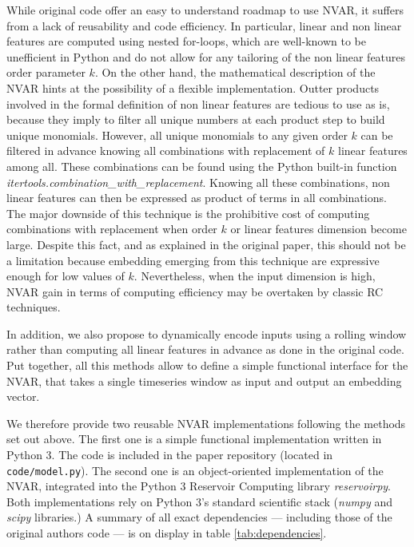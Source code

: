 While original code offer an easy to understand roadmap to use NVAR, it
suffers from a lack of reusability and code efficiency. In particular, linear
and non linear features are computed using nested for-loops, which are well-known
to be unefficient in Python and do not allow for any tailoring of the
non linear features order parameter $k$. On the other hand, the mathematical description
of the NVAR hints at the possibility of a flexible implementation. Outter
products involved in the formal definition of non linear features
are tedious to use as is, because they imply to filter all unique numbers
at each product step to build unique monomials. However, all unique monomials
to any given order $k$ can be filtered in advance knowing all combinations with replacement
of $k$ linear features among all. These combinations can be found using the Python
built-in function \emph{itertools.combination\_with\_replacement}. Knowing all these combinations,
non linear features can then be expressed as product of terms in all combinations.
The major downside of this technique is the prohibitive cost of computing
combinations with replacement when order $k$ or linear features dimension become large.
Despite this fact, and as explained in the original paper, this should not be
a limitation because embedding emerging from this technique are expressive
enough for low values of $k$. Nevertheless, when the input dimension is high,
NVAR gain in terms of computing efficiency may be overtaken by classic RC techniques.

In addition, we also propose to dynamically encode inputs using a rolling window rather
than computing all linear features in advance as done in the original code. Put together,
all this methods allow to define a simple functional interface for the NVAR, that
takes a single timeseries window as input and output an embedding vector.

We therefore provide two reusable NVAR implementations following the methods set out above.
The first one is a simple functional implementation written in Python 3. The code is included in the
paper repository (located in \texttt{code/model.py}). The second one is an object-oriented
implementation of the NVAR, integrated into the Python 3 Reservoir Computing library
\emph{reservoirpy}\cite{trouvain2020}. Both implementations rely on Python 3's standard
scientific stack (\emph{numpy} and \emph{scipy} libraries.)
A summary of all exact dependencies --- including those of the original authors code
--- is on display in table \ref{tab:dependencies}.

